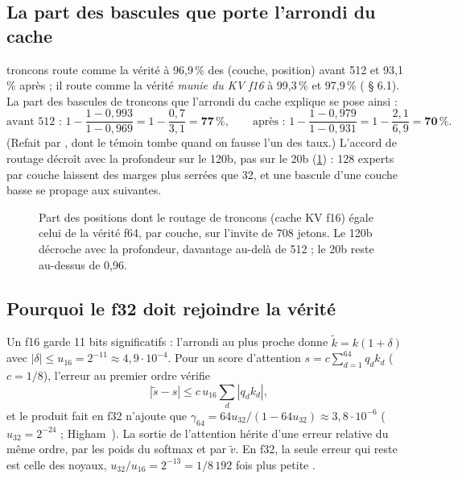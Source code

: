 \subsection{La part des bascules que porte l'arrondi du cache}\label{sec:t2r-part}

troncons route comme la vérité à 96,9\,\% des (couche, position) avant 512 et 93,1\,\% après ; il route comme la vérité \emph{munie du KV f16} à 99,3\,\% et 97,9\,\% ( § 6.1). La part des bascules de troncons que l'arrondi du cache explique se pose ainsi \calc :
\[
\text{avant 512 : } 1 - \frac{1 - 0{,}993}{1 - 0{,}969} = 1 - \frac{0{,}7}{3{,}1} = \mathbf{77\,\%}, \qquad
\text{après : } 1 - \frac{1 - 0{,}979}{1 - 0{,}931} = 1 - \frac{2{,}1}{6{,}9} = \mathbf{70\,\%}.
\]
(Refait par , dont le témoin tombe quand on fausse l'un des taux.) L'accord de routage décroît avec la profondeur sur le 120b, pas sur le 20b (\cref{fig:t2r-routage}) : 128 experts par couche laissent des marges plus serrées que 32, et une bascule d'une couche basse se propage aux suivantes.

\begin{figure}[ht]
\centering
\GrapheRefRoutage
\caption[Accord de routage par couche, moteur contre vérité]{Part des positions dont le routage de troncons (cache KV f16) égale celui de la vérité f64, par couche, sur l'invite de 708 jetons. Le 120b décroche avec la profondeur, davantage au-delà de 512 ; le 20b reste au-dessus de 0,96.}
\label{fig:t2r-routage}
\end{figure}

\subsection{Pourquoi le f32 doit rejoindre la vérité}\label{sec:t2r-f32-theorie}

Un f16 garde 11 bits significatifs : l'arrondi au plus proche donne $\tilde k = k(1 + \delta)$ avec $|\delta| \le u_{16} = 2^{-11} \approx 4{,}9\cdot10^{-4}$. Pour un score d'attention $s = c\sum_{d=1}^{64} q_d k_d$ ($c = 1/8$), l'erreur au premier ordre vérifie
\[
|\tilde s - s| \le c\, u_{16}\sum_d |q_d k_d|,
\]
et le produit fait en f32 n'ajoute que $\gamma_{64} = 64u_{32}/(1 - 64u_{32}) \approx 3{,}8\cdot10^{-6}$ ($u_{32} = 2^{-24}$ ; Higham~\cite{higham2002}). La sortie de l'attention hérite d'une erreur relative du même ordre, par les poids du softmax et par $\tilde v$. En f32, la seule erreur qui reste est celle des noyaux, $u_{32}/u_{16} = 2^{-13} = 1/8\,192$ fois plus petite \calc.

